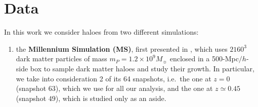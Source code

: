 \documentclass[a4paper,fleqn,usenatbib]{mnras}
\begin{document}
\section{Data}
\label{sec:data}
In this work we consider haloes from two different simulations: 
\begin{enumerate}
\item the \textbf{Millennium Simulation (MS)}, first presented in \citet{Springeletal2005}, which uses $2160^3$ dark matter particles of mass $m_P = 1.2 \times 10^9 M_{\sun}$ enclosed in a 500-Mpc$/h$-side box to sample dark matter haloes and study their growth. In particular, we take into consideration 2 of its 64 snapshots, i.e.\ the one at $z = 0$ (snapshot $63$), which we use for all our analysis, and the one at $z \simeq 0.45$ (snapshot $49$), which is studied only as an aside.


\end{enumerate}
\end{document}
